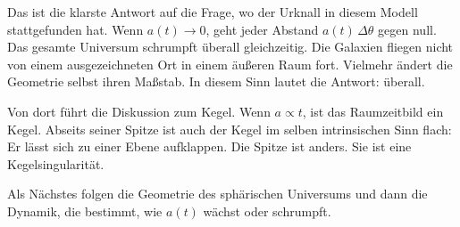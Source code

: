 Das ist die klarste Antwort auf die Frage, wo der Urknall in diesem Modell stattgefunden hat. Wenn \(a(t)\to 0\), geht jeder Abstand \(a(t)\,\Delta\theta\) gegen null. Das gesamte Universum schrumpft überall gleichzeitig. Die Galaxien fliegen nicht von einem ausgezeichneten Ort in einem äußeren Raum fort. Vielmehr ändert die Geometrie selbst ihren Maßstab. In diesem Sinn lautet die Antwort: überall.

\begin{classroomqa}
\end{classroomqa}

Von dort führt die Diskussion zum Kegel. Wenn \(a\propto t\), ist das Raumzeitbild ein Kegel. Abseits seiner Spitze ist auch der Kegel im selben intrinsischen Sinn flach: Er lässt sich zu einer Ebene aufklappen. Die Spitze ist anders. Sie ist eine Kegelsingularität.

Als Nächstes folgen die Geometrie des sphärischen Universums und dann die Dynamik, die bestimmt, wie \(a(t)\) wächst oder schrumpft.
